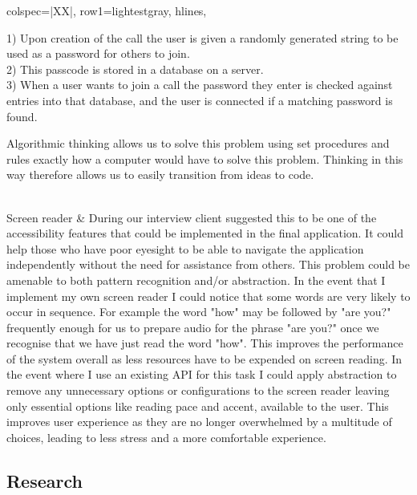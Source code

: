 \begin{longtblr}[
  caption={Features and their justifications},
  label={tblr:features}
]{
  colspec={|XX|},
  row{1}={lightestgray},
  hlines,
}
{  \vspace{0.2cm}
  1) Upon creation of the call the user is given a randomly 
  generated string to be used as a password for others to 
  join.\\

  2) This passcode is stored in a database on a server.\\

  3) When a user wants to join a call the password they enter 
  is checked against entries into that database, and the user
  is connected if a matching password is found.\\
  \vspace{0.2cm}

  Algorithmic thinking allows us to solve this problem using 
  set procedures and rules exactly how a computer would have to
  solve this problem. Thinking in this way therefore allows us
  to easily transition from ideas to code.}\\

  Screen reader & {During our interview client suggested this
  to be one of the accessibility features that could be
  implemented in the final application. It could help those 
  who have poor eyesight to be able to navigate the application
  independently without the need for assistance from others. 
  This problem could be amenable to both pattern recognition 
  and/or abstraction. In the event that I implement my own 
  screen reader I could notice that some words are very likely
  to occur in sequence. For example the word "how" may be 
  followed by "are you?" frequently enough for us to prepare 
  audio for the phrase "are you?" once we recognise that we 
  have just read the word "how". This improves the performance
  of the system overall as less resources have to be expended
  on screen reading. In the event where I use an existing API 
  for this task I could apply abstraction to remove any unnecessary 
  options or configurations to the screen reader leaving only
  essential options like reading pace and accent, available to 
  the user. This improves user experience as they are no longer
  overwhelmed by a multitude of choices, leading to less stress
  and a more comfortable experience. \cite{overchoice}}

\end{longtblr}

\subsection{Research}

